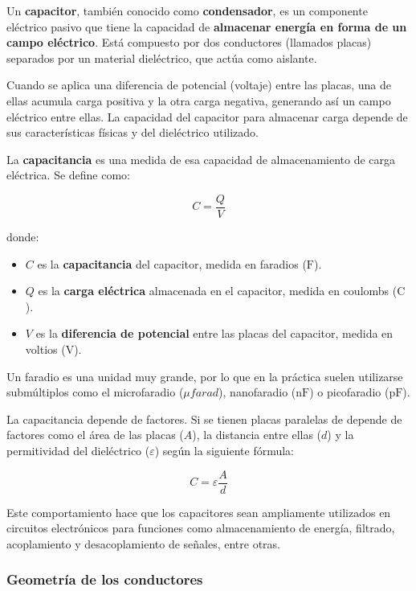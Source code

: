 Un \textbf{capacitor}, también conocido como \textbf{condensador}, es un componente eléctrico pasivo que tiene la capacidad de \textbf{almacenar energía en forma de un campo eléctrico}. Está compuesto por dos conductores (llamados placas) separados por un material dieléctrico, que actúa como aislante.

Cuando se aplica una diferencia de potencial (voltaje) entre las placas, una de ellas acumula carga positiva y la otra carga negativa, generando así un campo eléctrico entre ellas. La capacidad del capacitor para almacenar carga depende de sus características físicas y del dieléctrico utilizado.

La \textbf{capacitancia} es una medida de esa capacidad de almacenamiento de carga eléctrica. Se define como:

\begin{equation}
    C = \frac{Q}{V}
    \label{eq:capacitance}    
\end{equation}

donde:

\begin{itemize}
    \item \( C \) es la \textbf{capacitancia} del capacitor, medida en faradios (\(\si{\farad}\)).
    \item \( Q \) es la \textbf{carga eléctrica} almacenada en el capacitor, medida en coulombs (\(\si{\coulomb}\)).
    \item \( V \) es la \textbf{diferencia de potencial} entre las placas del capacitor, medida en voltios (\(\si{\volt}\)).
\end{itemize}

Un faradio es una unidad muy grande, por lo que en la práctica suelen utilizarse submúltiplos como el microfaradio (\(\mu\si{farad}\)), nanofaradio (n\(\si{\farad}\)) o picofaradio (p\(\si{\farad}\)).

La capacitancia depende de factores. Si se tienen placas paralelas de depende de factores como el área de las placas (\(A\)), la distancia entre ellas (\(d\)) y la permitividad del dieléctrico (\( \varepsilon \)) según la siguiente fórmula:

\[
C = \varepsilon \frac{A}{d}
\]

Este comportamiento hace que los capacitores sean ampliamente utilizados en circuitos electrónicos para funciones como almacenamiento de energía, filtrado, acoplamiento y desacoplamiento de señales, entre otras.

\subsubsection{Geometría de los conductores}

